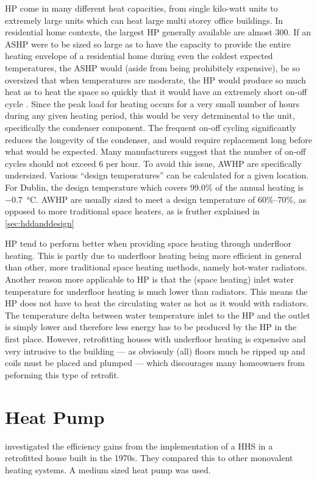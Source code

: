 \acs{HP} come in many different heat capacities, from single kilo-watt units to extremely large units which can heat large multi storey office buildings. In residential home contexts, the largest \acs{HP} generally available are almost \SI{300}{\kilowatt}. If an \ac{ASHP} were to be sized so large as to have the capacity to provide the entire heating envelope of a residential home during even the coldest expected temperatures, the \ac{ASHP} would (aside from being prohibitely expensive), be so oversized that when temperatures are moderate, the \ac{HP} would produce so much heat as to heat the space so quickly that it would have an extremely short on-off cycle \cite{bee_air-source_2019}. Since the peak load for heating occurs for a very small number of hours during any given heating period, this would be very detrminental to the unit, specifically the condenser component. The frequent on-off cycling significantly reduces the longevity of the condenser, and would require replacement long before what would be expected. Many manufacturers suggest that the number of on-off cycles should not exceed 6 per hour. %
To avoid this issue, \acs{AWHP} are specifically undersized. Various ``design temperatures'' can be calculated for a given location. For Dublin, the design temperature which covers 99.0\% of the annual heating is \SI{-0.7}{\celsius}. \acs{AWHP} are usually sized to meet a design temperature of 60\%--70\%, as opposed to more traditional space heaters, as is fruther explained in \cref{sec:hddanddesign}%

\acs{HP} tend to perform better when providing space heating through underfloor heating. This is partly due to underfloor heating being more efficient in general than other, more traditional space heating methods, namely hot-water radiators. Another reason more applicable to \acs{HP} is that the (space heating) inlet water temperature for underfloor heating is much lower than radiators. This means the \ac{HP} does not have to heat the circulating water as hot as it would with radiators. The temperature delta between water temperature inlet to the \ac{HP} and the outlet is simply lower and therefore less energy has to be produced by the \ac{HP} in the first place. However, retrofitting houses with underfloor heating is expensive and very intrusive to the building --- as obviosuly (all) floors much be ripped up and coils must be placed and plumped --- which discourages many homeowners from peforming this type of retrofit.

\section{Heat Pump}
\cite{klein_numerical_2014} investigated the efficiency gains from the implementation of a \ac{HHS} in a retrofitted house built in the 1970s. They compared this to other monovalent heating systems. A medium sized heat pump was used. 




